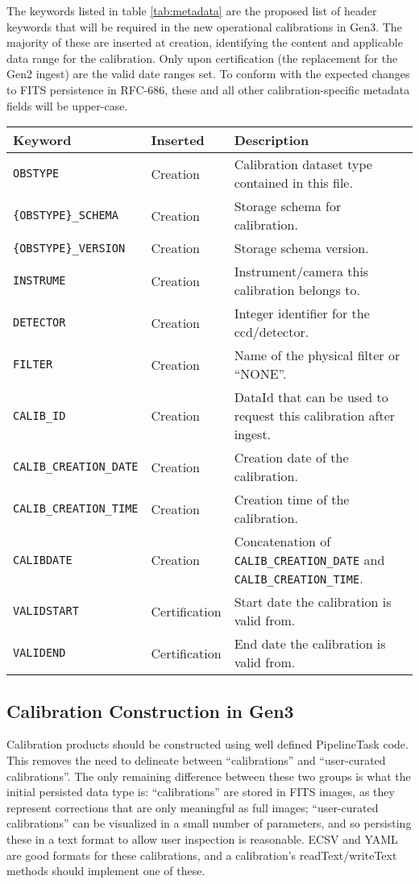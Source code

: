 \documentclass[DM,authoryear,toc]{lsstdoc}
\begin{document}
The keywords listed in table \ref{tab:metadata} are the proposed list
of header keywords that will be required in the new operational
calibrations in Gen3.  The majority of these are inserted at creation,
identifying the content and applicable data range for the calibration.
Only upon certification (the replacement for the Gen2 ingest) are the
valid date ranges set.  To conform with the expected changes to FITS
persistence in RFC-686, these and all other calibration-specific
metadata fields will be upper-case.

\begin{tabular}{l l l}
  \label{tab:metadata}
  Keyword & Inserted & Description \\
  \hline
  \verb|OBSTYPE| & Creation & Calibration dataset type contained in this file. \\
  \verb|{OBSTYPE}_SCHEMA| & Creation & Storage schema for calibration.  \\
  \verb|{OBSTYPE}_VERSION| & Creation & Storage schema version. \\
  \verb|INSTRUME| & Creation & Instrument/camera this calibration belongs to. \\
  \verb|DETECTOR| & Creation & Integer identifier for the ccd/detector. \\
  \verb|FILTER| & Creation & Name of the physical filter or ``NONE''. \\
  \verb|CALIB_ID| & Creation & DataId that can be used to request this calibration after ingest. \\
  \verb|CALIB_CREATION_DATE| & Creation & Creation date of the calibration. \\
  \verb|CALIB_CREATION_TIME| & Creation & Creation time of the calibration. \\
  \verb|CALIBDATE| & Creation & Concatenation of \verb|CALIB_CREATION_DATE| and \verb|CALIB_CREATION_TIME|. \\
  \verb|VALIDSTART| & Certification & Start date the calibration is valid from.  \\
  \verb|VALIDEND| & Certification & End date the calibration is valid from.  \\
\end{tabular}


\subsection{Calibration Construction in Gen3}

Calibration products should be constructed using well defined
PipelineTask code.  This removes the need to delineate between
``calibrations'' and ``user-curated calibrations''.  The only
remaining difference between these two groups is what the initial
persisted data type is: ``calibrations'' are stored in FITS images, as
they represent corrections that are only meaningful as full images;
``user-curated calibrations'' can be visualized in a small number of
parameters, and so persisting these in a text format to allow user
inspection is reasonable.  ECSV and YAML are good formats for these
calibrations, and a calibration's readText/writeText methods should
implement one of these.
\end{document}
